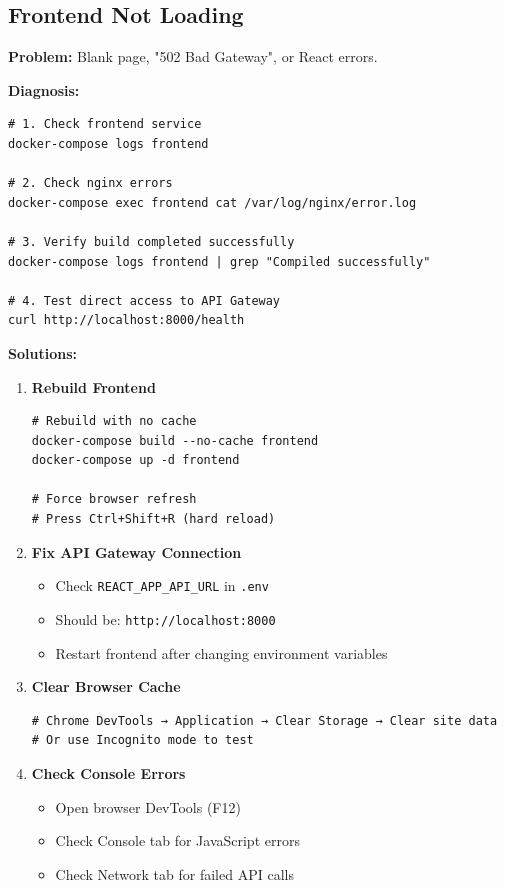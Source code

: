 \subsection{Frontend Not Loading}

\textbf{Problem:} Blank page, "502 Bad Gateway", or React errors.

\textbf{Diagnosis:}
\begin{commandbox}
\begin{lstlisting}[style=bashstyle]
# 1. Check frontend service
docker-compose logs frontend

# 2. Check nginx errors
docker-compose exec frontend cat /var/log/nginx/error.log

# 3. Verify build completed successfully
docker-compose logs frontend | grep "Compiled successfully"

# 4. Test direct access to API Gateway
curl http://localhost:8000/health
\end{lstlisting}
\end{commandbox}

\textbf{Solutions:}

\begin{enumerate}
    \item \textbf{Rebuild Frontend}
    \begin{lstlisting}[style=bashstyle]
# Rebuild with no cache
docker-compose build --no-cache frontend
docker-compose up -d frontend

# Force browser refresh
# Press Ctrl+Shift+R (hard reload)
\end{lstlisting}

    \item \textbf{Fix API Gateway Connection}
    \begin{itemize}
        \item Check \texttt{REACT\_APP\_API\_URL} in \texttt{.env}
        \item Should be: \texttt{http://localhost:8000}
        \item Restart frontend after changing environment variables
    \end{itemize}

    \item \textbf{Clear Browser Cache}
    \begin{lstlisting}[style=bashstyle]
# Chrome DevTools → Application → Clear Storage → Clear site data
# Or use Incognito mode to test
\end{lstlisting}

    \item \textbf{Check Console Errors}
    \begin{itemize}
        \item Open browser DevTools (F12)
        \item Check Console tab for JavaScript errors
        \item Check Network tab for failed API calls
    \end{itemize}
\end{enumerate}

